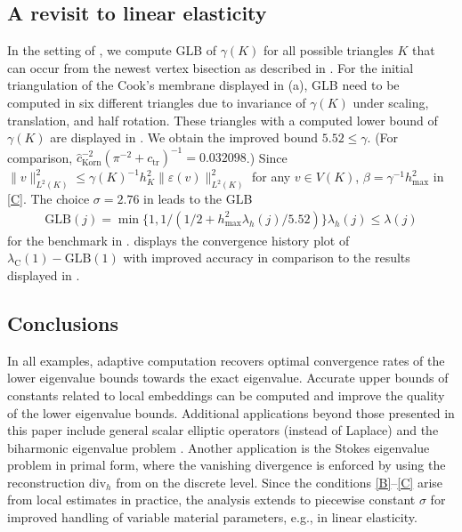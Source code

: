 \documentclass[a4paper]{amsart}
\numberwithin{equation}{section}
\renewcommand{\div}{\mathrm{div}}
\theoremstyle{remark}
\theoremstyle{definition}
\theoremstyle{assumptionnoperiod}
\begin{document}
\subsection{A revisit to linear elasticity}\label{sec:ex-le-impr}
In the setting of , we compute GLB of $\gamma(K)$
for all possible triangles $K$ that can occur from the newest vertex bisection as described in . For the initial triangulation of the Cook's membrane displayed in (a), GLB need to be computed in six different triangles due to invariance of $\gamma(K)$ under scaling, translation, and half rotation. These triangles with a computed lower bound of $\gamma(K)$ are displayed in . We obtain the improved bound $5.52 \leq \gamma$. (For comparison, $\hat{c}_\mathrm{Korn}^{-2}(\pi^{-2} + c_\mathrm{tr})^{-1} = 0.032098$.)
Since $\|v\|_{L^2(K)}^2 \leq \gamma(K)^{-1} h_K^2\|\varepsilon(v)\|_{L^2(K)}^2$ for any $v \in V(K)$, $\beta = \gamma^{-1} h_\mathrm{max}^2$ in \ref{C}.
The choice $\sigma = 2.76$ in  leads to the GLB
\begin{align*}
	\mathrm{GLB}(j) = \min\{1,1/(1/2 + h_\mathrm{max}^2\lambda_h(j)/5.52)\}\lambda_h(j) \leq \lambda(j)
\end{align*}
for the benchmark in .  displays the convergence history plot of $\lambda_\mathrm{C}(1) - \mathrm{GLB}(1)$ with improved accuracy in comparison to the results displayed in .

\subsection{Conclusions}
In all examples, adaptive computation recovers optimal convergence rates of the lower eigenvalue bounds towards the exact eigenvalue.
Accurate upper bounds of constants related to local embeddings can be computed and improve the quality of the lower eigenvalue bounds.
Additional applications beyond those presented in this paper include general scalar elliptic operators (instead of Laplace) and the biharmonic eigenvalue problem \cite{DongErn2022,LiangTran2025}.
Another application is the Stokes eigenvalue problem in primal form, where the vanishing divergence is enforced by using the reconstruction $\div_h$ from  on the discrete level.
Since the conditions \ref{B}--\ref{C} arise from local estimates in practice, the analysis extends to piecewise constant $\sigma$ for improved handling of variable material parameters, e.g., in linear elasticity.

\printbibliography
\end{document}
